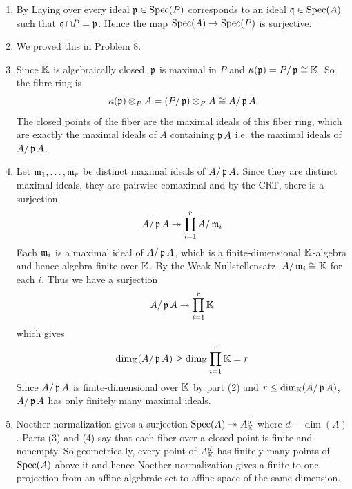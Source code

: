 \documentclass[Notebook.tex]{subfiles}
\begin{document}
\begin{solution}
    \bbni 
    \begin{enumerate}
        \item By Laying over every ideal $\operatorname{\mathfrak{p}} \in \operatorname{Spec}(P)$ corresponds to an ideal $\operatorname{\mathfrak{q}} \in \operatorname{Spec}(A)$ such that $\operatorname{\mathfrak{q}} \cap P = \operatorname{\mathfrak{p}}$. Hence the map $\operatorname{Spec}(A) \to \operatorname{Spec}(P)$ is surjective. 
        
        \item We proved this in Problem 8. 
        
        \item Since $\mathbb K$ is algebraically closed, $\operatorname{\mathfrak{p}}$ is maximal in $P$ and $\kappa(\operatorname{\mathfrak{p}}) = P/\operatorname{\mathfrak{p}} \cong \mathbb K$. So the fibre ring is
        \[\kappa(\operatorname{\mathfrak{p}}) \otimes_P A = (P/\operatorname{\mathfrak{p}}) \otimes_P A \cong A/\operatorname{\mathfrak{p}} A\]
        The closed points of the fiber are the maximal ideals of this fiber ring, which are exactly the maximal ideals of $A$ containing $\operatorname{\mathfrak{p}} A$ i.e. the maximal ideals of $A/\operatorname{\mathfrak{p}} A$. 

        \item Let $\operatorname{\mathfrak{m}}_1, \ldots, \operatorname{\mathfrak{m}}_r$ be distinct maximal ideals of $A/\operatorname{\mathfrak{p}} A$. Since they are distinct maximal ideals, they are pairwise comaximal and by the CRT, there is a surjection
        \[A/\operatorname{\mathfrak{p}} A \twoheadrightarrow \prod_{i=1}^r A/\operatorname{\mathfrak{m}}_i\]
        Each $\operatorname{\mathfrak{m}}_i$ is a maximal ideal of $A/\operatorname{\mathfrak{p}} A$, which is a finite-dimensional $\mathbb K$-algebra and hence algebra-finite over $\mathbb K$. By the Weak Nullstellensatz, $A/\operatorname{\mathfrak{m}}_i \cong \mathbb K$ for each $i$. Thus we have a surjection
        \[A/\operatorname{\mathfrak{p}} A \twoheadrightarrow \prod_{i=1}^r \mathbb K\]
        which gives
        \[\dim_\mathbb K(A/\operatorname{\mathfrak{p}} A) \geq \dim_\mathbb K \prod_{i=1}^r \mathbb K = r\]
        Since $A/\operatorname{\mathfrak{p}} A$ is finite-dimensional over $\mathbb K$ by part (2) and $r \leq \dim_\mathbb K(A/\operatorname{\mathfrak{p}} A)$, $A/\operatorname{\mathfrak{p}} A$ has only finitely many maximal ideals.

        \item Noether normalization gives a surjection $\operatorname{Spec}(A) \twoheadrightarrow A_{\mathbb K}^d$ where $d - \dim(A)$. Parts (3) and (4) say that each fiber over a closed point is finite and nonempty. So geometrically, every point of $A_{\mathbb K}^d$ has finitely many points of $\operatorname{Spec}(A)$ above it and hence Noether normalization gives a finite-to-one projection from an affine algebraic set to affine space of the same dimension.
    \end{enumerate}
\end{solution}
\end{document}
